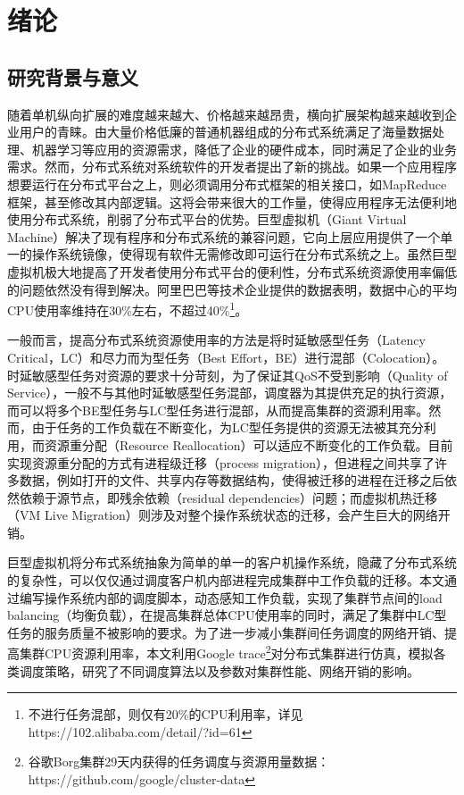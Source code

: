 
\chapter{绪论}
\label{chap:Intro}
\section{研究背景与意义}
随着单机纵向扩展的难度越来越大、价格越来越昂贵，横向扩展架构越来越收到企业用户的青睐。由大量价格低廉的普通机器组成的分布式系统满足了海量数据处理、机器学习等应用的资源需求，降低了企业的硬件成本，同时满足了企业的业务需求。然而，分布式系统对系统软件的开发者提出了新的挑战。如果一个应用程序想要运行在分布式平台之上，则必须调用分布式框架的相关接口，如MapReduce\cite{MapReduce}框架，甚至修改其内部逻辑。这将会带来很大的工作量，使得应用程序无法便利地使用分布式系统，削弱了分布式平台的优势。巨型虚拟机（Giant Virtual Machine）\cite{giantvm}解决了现有程序和分布式系统的兼容问题，它向上层应用提供了一个单一的操作系统镜像，使得现有软件无需修改即可运行在分布式系统之上。虽然巨型虚拟机极大地提高了开发者使用分布式平台的便利性，分布式系统资源使用率偏低的问题依然没有得到解决。阿里巴巴等技术企业提供的数据表明，数据中心的平均CPU使用率维持在30\%左右，不超过40\%\footnote{不进行任务混部，则仅有20\%的CPU利用率，详见https://102.alibaba.com/detail/?id=61}。

一般而言，提高分布式系统资源使用率的方法是将时延敏感型任务（Latency Critical，LC）和尽力而为型任务（Best Effort，BE）进行混部（Colocation）。时延敏感型任务对资源的要求十分苛刻，为了保证其QoS不受到影响（Quality of Service），一般不与其他时延敏感型任务混部，调度器为其提供充足的执行资源，而可以将多个BE型任务与LC型任务进行混部，从而提高集群的资源利用率。然而，由于任务的工作负载在不断变化，为LC型任务提供的资源无法被其充分利用，而资源重分配（Resource Reallocation）可以适应不断变化的工作负载。目前实现资源重分配的方式有进程级迁移（process migration），但进程之间共享了许多数据，例如打开的文件、共享内存等数据结构，使得被迁移的进程在迁移之后依然依赖于源节点，即残余依赖（residual dependencies）\cite{residual}问题；而虚拟机热迁移（VM Live Migration）\cite{livemigration}则涉及对整个操作系统状态的迁移，会产生巨大的网络开销。

巨型虚拟机将分布式系统抽象为简单的单一的客户机操作系统，隐藏了分布式系统的复杂性，可以仅仅通过调度客户机内部进程完成集群中工作负载的迁移。本文通过编写操作系统内部的调度脚本，动态感知工作负载，实现了集群节点间的load balancing（均衡负载），在提高集群总体CPU使用率的同时，满足了集群中LC型任务的服务质量不被影响的要求。为了进一步减小集群间任务调度的网络开销、提高集群CPU资源利用率，本文利用Google trace\footnote{谷歌Borg集群29天内获得的任务调度与资源用量数据：https://github.com/google/cluster-data}对分布式集群进行仿真，模拟各类调度策略，研究了不同调度算法以及参数对集群性能、网络开销的影响。

